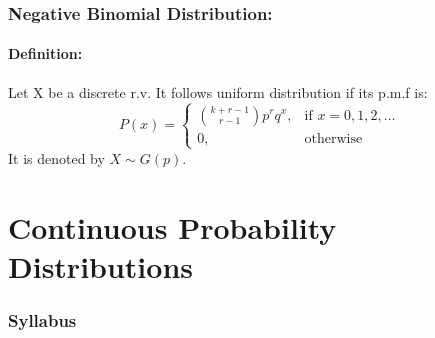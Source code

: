 \documentclass[
10pt, %
a4paper, %
]{report}
\begin{document}
\newpage

\section*{Negative Binomial Distribution:}
\subsection*{Definition:}
Let X be a discrete r.v. It follows uniform distribution if its p.m.f is:
\[
    P(x)= 
\begin{cases}
    \binom{k+r-1}{r-1} p^r q^x,    & \text{if } x = 0, 1, 2, \dots\\
    0,              & \text{otherwise}
\end{cases}
\]
It is denoted by \(X \sim G(p).\) 

\part{Continuous Probability Distributions}
\section*{Syllabus}
\end{document}

